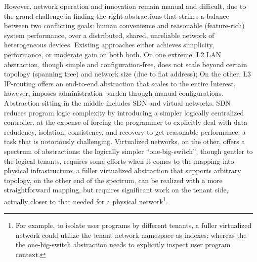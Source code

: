 
However, network operation and innovation remain manual and difficult,
due to the grand challenge in finding the right abstractions that
strikes a balance between two conflicting goals: human convenience and
reasonable (feature-rich) system performance, over a distributed,
shared, unreliable network of heterogeneous devices. %
Existing approaches either achieves simplicity, performance, or
moderate gain on both both.  On one extreme, L2 LAN abstraction,
though simple and configuration-free, does not scale beyond certain
topology (\eg spanning tree) and network size (due to flat address);
On the other, L3 IP-routing offers an end-to-end abstraction that
scales to the entire Interest, however, imposes administration burden
through manual configurations. Abstraction sitting in the middle
includes SDN and virtual networks. SDN reduces program logic
complexity by introducing a simpler logically centralized controller,
at the expense of forcing the programmer to explicitly deal with data
redudency, isolation, consistency, and recovery to get reasonable
performance, a task that is notoriously challenging.  Virtualized
networks, on the other, offers a spectrum of abstractions: the
logically simpler ``one-big-switch'', though gentler to the logical
tenants, requires some efforts when it comes to the mapping into
physical infrastructure; a fuller virtualized abstraction that
supports arbitrary topology, on the other end of the spectrum, can be
realized with a more straightforward mapping, but requires significant
work on the tenant side, actually closer to that needed for a physical
network\footnote{For example, to isolate user programs by different
  tenants, a fuller virtualized network could utilize the tenant
  network namespace as indexes; whereas the the one-big-switch
  abstraction needs to explicitly inspect user program context.}.


